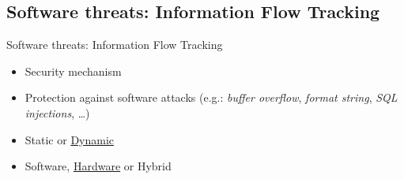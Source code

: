 \subsection{Software threats: Information Flow Tracking}
\begin{frame}{Software threats: Information Flow Tracking}
    \begin{block}{}
        \begin{itemize}
            [square]
            \justifying
            \item Security mechanism
            \item Protection against software attacks (e.g.: \textit{buffer overflow}, \textit{format string}, \textit{SQL injections}, \ldots)~\cite{BSMCVEJCO-21-acmcsur, HAK-21-acmcsur}
            \item Static or \underline{Dynamic}
            \item Software, \underline{Hardware} or Hybrid
             
        \end{itemize}
    \end{block}
    


\end{frame}

